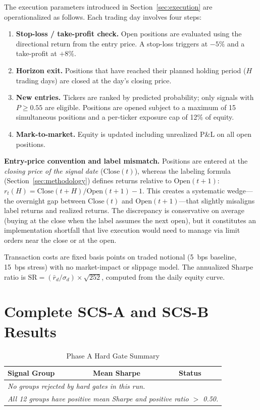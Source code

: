 \documentclass[12pt,a4paper]{article}
\begin{document}
The execution parameters introduced in Section~\ref{sec:execution} are operationalized as follows. Each trading day involves four steps:

\begin{enumerate}
  \item \textbf{Stop-loss / take-profit check.} Open positions are evaluated using the directional return from the entry price. A stop-loss triggers at $-5\%$ and a take-profit at $+8\%$.
  \item \textbf{Horizon exit.} Positions that have reached their planned holding period ($H$ trading days) are closed at the day's closing price.
  \item \textbf{New entries.} Tickers are ranked by predicted probability; only signals with $P \geq 0.55$ are eligible. Positions are opened subject to a maximum of 15 simultaneous positions and a per-ticker exposure cap of 12\% of equity.
  \item \textbf{Mark-to-market.} Equity is updated including unrealized P\&L on all open positions.
\end{enumerate}

\textbf{Entry-price convention and label mismatch.} Positions are entered at the \emph{closing price of the signal date} ($\text{Close}(t)$), whereas the labeling formula (Section~\ref{sec:methodology}) defines returns relative to $\text{Open}(t{+}1)$: $r_t(H) = \text{Close}(t{+}H) / \text{Open}(t{+}1) - 1$. This creates a systematic wedge---the overnight gap between $\text{Close}(t)$ and $\text{Open}(t{+}1)$---that slightly misaligns label returns and realized returns. The discrepancy is conservative on average (buying at the close when the label assumes the next open), but it constitutes an implementation shortfall that live execution would need to manage via limit orders near the close or at the open.

Transaction costs are fixed basis points on traded notional (5~bps baseline, 15~bps stress) with no market-impact or slippage model. The annualized Sharpe ratio is $\text{SR} = (\bar{r}_d / \sigma_d) \times \sqrt{252}$, computed from the daily equity curve.


\section{Complete SCS-A and SCS-B Results}
\label{app:full_results}

\begin{table}[H]
\centering
\caption{Phase A Hard Gate Summary}
\label{tab:rejection}
\begin{tabular}{lll}
\toprule
Signal Group & Mean Sharpe & Status \\
\midrule
\multicolumn{3}{l}{\textit{No groups rejected by hard gates in this run.}} \\
\multicolumn{3}{l}{\textit{All 12 groups have positive mean Sharpe and positive ratio $>$ 0.50.}} \\
\bottomrule
\end{tabular}
\end{table}
\end{document}
